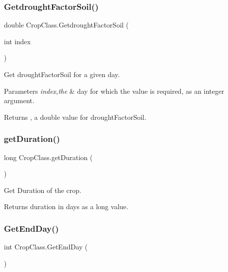 \subsubsection{\texorpdfstring{GetdroughtFactorSoil()}{GetdroughtFactorSoil()}\hspace{0.1cm}{\footnotesize\ttfamily [2/2]}}
{\footnotesize\ttfamily double Crop\+Class.\+Getdrought\+Factor\+Soil (\begin{DoxyParamCaption}\item[{int}]{index }\end{DoxyParamCaption})\hspace{0.3cm}{\ttfamily [inline]}}



Get drought\+Factor\+Soil for a given day. 


\begin{DoxyParams}{Parameters}
{\em index,the} & day for which the value is required, as an integer argument. \\
\hline
\end{DoxyParams}
\begin{DoxyReturn}{Returns}
, a double value for drought\+Factor\+Soil. 
\end{DoxyReturn}
\mbox{\label{class_crop_class_af38f276503873c6a87777f9607b6b451}} 
\subsubsection{\texorpdfstring{getDuration()}{getDuration()}}
{\footnotesize\ttfamily long Crop\+Class.\+get\+Duration (\begin{DoxyParamCaption}{ }\end{DoxyParamCaption})\hspace{0.3cm}{\ttfamily [inline]}}



Get Duration of the crop. 

\begin{DoxyReturn}{Returns}
duration in days as a long value. 
\end{DoxyReturn}
\mbox{\label{class_crop_class_afd83e45f266ef122520eda982353851c}} 
\subsubsection{\texorpdfstring{GetEndDay()}{GetEndDay()}}
{\footnotesize\ttfamily int Crop\+Class.\+Get\+End\+Day (\begin{DoxyParamCaption}{ }\end{DoxyParamCaption})\hspace{0.3cm}{\ttfamily [inline]}}



